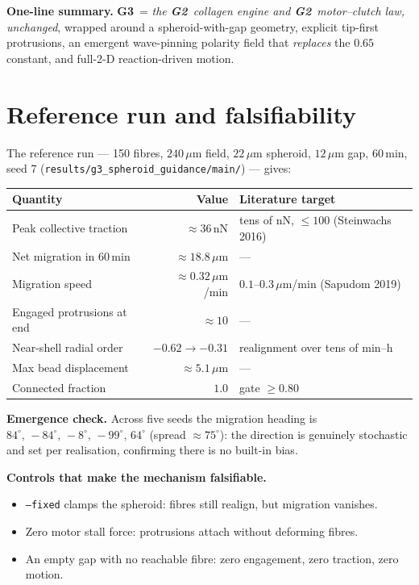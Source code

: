 \documentclass[11pt]{article}
\newcommand{\umt}{\mu\text{m}}            %
\newcommand{\um}{\,\umt}
\newcommand{\nN}{\,\text{nN}}
\newcommand{\GTwo}{\textcolor{g2col}{\textbf{G2}}}
\newcommand{\GThree}{\textcolor{g3col}{\textbf{G3}}}
\newcommand{\code}[1]{\texttt{\small #1}}
\begin{document}
\noindent\textbf{One-line summary.} \GThree\ = \emph{the \GTwo\ collagen engine and \GTwo\ motor--clutch
law, unchanged}, wrapped around a spheroid-with-gap geometry, explicit tip-first protrusions, an
emergent wave-pinning polarity field that \emph{replaces} the $0.65$ constant, and full-2-D
reaction-driven motion.

\section{Reference run and falsifiability}
\label{sec:results}

The reference run --- 150 fibres, $240\um$ field, $22\um$ spheroid, $12\um$ gap, $60\,\text{min}$,
seed 7 (\code{results/g3\_spheroid\_guidance/main/}) --- gives:

\begin{center}
\begin{tabular}{@{}l r l@{}}
\toprule
\textbf{Quantity} & \textbf{Value} & \textbf{Literature target} \\
\midrule
Peak collective traction & $\approx 36\nN$ & tens of nN, $\le100$ (Steinwachs 2016) \\
Net migration in $60\,$min & $\approx 18.8\um$ & --- \\
Migration speed & $\approx 0.32\um$/min & $0.1$--$0.3\um$/min (Sapudom 2019) \\
Engaged protrusions at end & $\approx 10$ & --- \\
Near-shell radial order & $-0.62 \to -0.31$ & realignment over tens of min--h \\
Max bead displacement & $\approx 5.1\um$ & --- \\
Connected fraction & $1.0$ & gate $\ge 0.80$ \\
\bottomrule
\end{tabular}
\end{center}

\noindent\textbf{Emergence check.} Across five seeds the migration heading is
$84^\circ,\,-84^\circ,\,-8^\circ,\,-99^\circ,\,64^\circ$ (spread $\approx75^\circ$): the direction
is genuinely stochastic and set per realisation, confirming there is no built-in bias.

\noindent\textbf{Controls that make the mechanism falsifiable.}
\begin{itemize}[leftmargin=1.4em,itemsep=1pt]
  \item \code{--fixed} clamps the spheroid: fibres still realign, but migration vanishes.
  \item Zero motor stall force: protrusions attach without deforming fibres.
  \item An empty gap with no reachable fibre: zero engagement, zero traction, zero motion.
\end{itemize}
\end{document}
